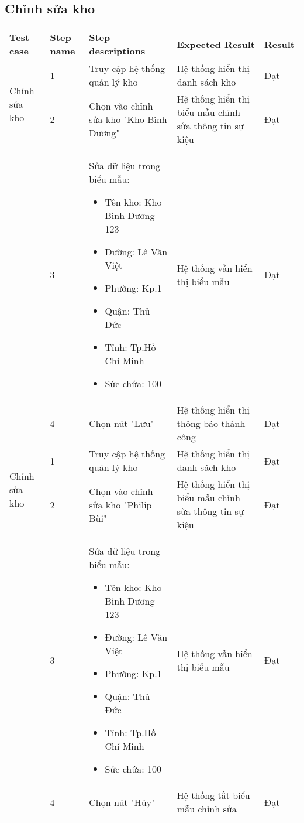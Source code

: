 \subsection{Chỉnh sửa kho}
{
    \setlength\extrarowheight{6pt}
    \begin{longtable}{| p{2.5cm}| p{1cm}| p{5.5cm}| p{4.5cm} | p{1.5cm} |}
        \hline
        \textbf{Test case} & \textbf{Step name} & \textbf{Step descriptions} & \textbf{Expected Result} & \textbf{Result} \\
        \hline
        \multirow[t]{2}{2.5cm}{Chỉnh sửa kho} & 1 & Truy cập hệ thống quản lý kho & Hệ thống hiển thị danh sách kho & Đạt \\
        \cline{2-5}
         & 2 & Chọn vào chỉnh sửa kho "Kho Bình Dương" & Hệ thống hiển thị biểu mẫu chỉnh sửa thông tin sự kiệu & Đạt \\
        \cline{2-5}
        & 3 & Sửa dữ liệu trong biểu mẫu:
        \begin{itemize}
            \item Tên kho: Kho Bình Dương 123
            \item Đường: Lê Văn Việt
            \item Phường: Kp.1
            \item Quận: Thủ Đức 
            \item Tỉnh: Tp.Hồ Chí Minh
            \item Sức chứa: 100
        \end{itemize} & Hệ thống vẫn hiển thị biểu mẫu & Đạt \\
        \cline{2-5}
         & 4 & Chọn nút "Lưu" & Hệ thống hiển thị thông báo thành công & Đạt \\
        \hline
        \multirow[t]{2}{2.5cm}{Chỉnh sửa kho} & 1 & Truy cập hệ thống quản lý kho & Hệ thống hiển thị danh sách kho & Đạt \\
        \cline{2-5}
         & 2 & Chọn vào chỉnh sửa kho "Philip Bùi" & Hệ thống hiển thị biểu mẫu chỉnh sửa thông tin sự kiệu & Đạt \\
        \cline{2-5}
        & 3 & Sửa dữ liệu trong biểu mẫu:
        \begin{itemize}
            \item Tên kho: Kho Bình Dương 123
            \item Đường: Lê Văn Việt
            \item Phường: Kp.1
            \item Quận: Thủ Đức 
            \item Tỉnh: Tp.Hồ Chí Minh
            \item Sức chứa: 100
        \end{itemize} & Hệ thống vẫn hiển thị biểu mẫu & Đạt \\
        \cline{2-5}
         & 4 & Chọn nút "Hủy" & Hệ thống tắt biểu mẫu chỉnh sửa & Đạt \\
        \hline
    \end{longtable} 
}


